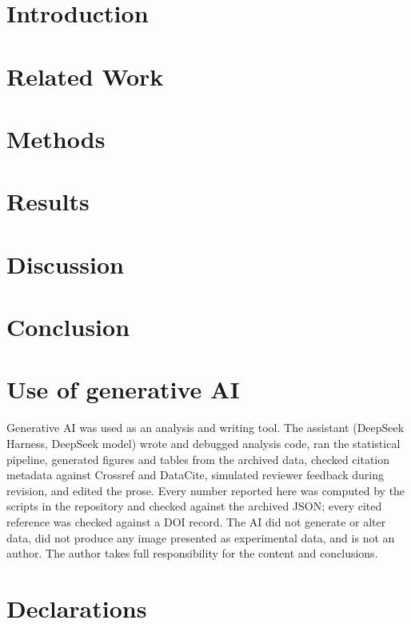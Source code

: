 \documentclass[11pt,a4paper]{article}
\begin{document}
\section{Introduction}


\section{Related Work}


\section{Methods}


\section{Results}


\section{Discussion}


\section{Conclusion}


\section*{Use of generative AI}
Generative AI was used as an analysis and writing tool. The assistant (DeepSeek Harness,
DeepSeek model) wrote and debugged analysis code, ran the statistical pipeline, generated
figures and tables from the archived data, checked citation metadata against Crossref and
DataCite, simulated reviewer feedback during revision, and edited the prose. Every number
reported here was computed by the scripts in the repository and checked against the
archived JSON; every cited reference was checked against a DOI record. The AI did not
generate or alter data, did not produce any image presented as experimental data, and is
not an author. The author takes full responsibility for the content and conclusions.

\section*{Declarations}
\end{document}
